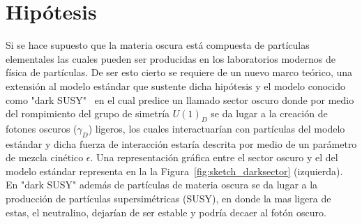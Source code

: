 \chapter{Hipótesis}


Si se hace supuesto que la materia oscura está compuesta de partículas elementales las cuales pueden ser producidas en los laboratorios modernos de física de partículas. De ser esto cierto se requiere de un nuevo marco teórico, una extensión al modelo estándar que sustente dicha hipótesis y el modelo conocido como "dark SUSY"~\cite{susy} en el cual predice un llamado sector oscuro donde por medio del rompimiento del grupo de simetría $U(1)_{D}$ se da lugar a la creación de fotones oscuros ($\gamma_{D}$) ligeros, los cuales interactuarían con partículas del modelo estándar y dicha fuerza de interacción estaría descrita por medio de un parámetro de mezcla cinético $\epsilon$.  Una representación gráfica entre el sector oscuro y el del modelo estándar representa en la la Figura~\ref{fig:sketch_darksector} (izquierda). En "dark SUSY" además de partículas de materia oscura se da lugar a la producción de partículas supersimétricas (SUSY), en donde la mas ligera de estas, el neutralino, dejarían de ser estable y podría decaer al fotón oscuro. 

